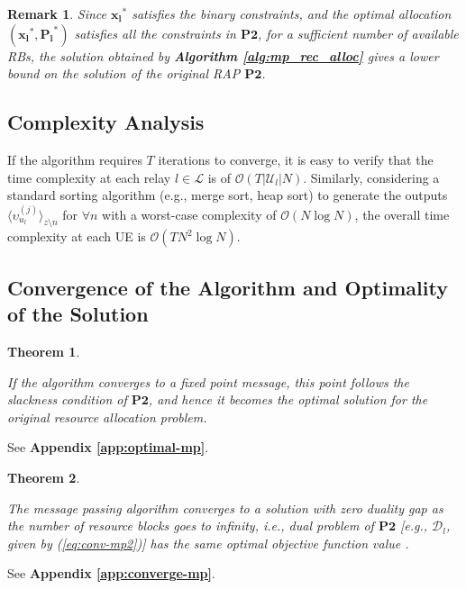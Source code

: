 \documentclass[twocolumn,10pt]{IEEEtran}
\newtheorem{theorem}{Theorem}
\newtheorem{remark}{Remark}
\begin{document}
\begin{remark}
\label{rem:algo_bound}
Since ${\mathbf{x}_{\boldsymbol l}}^*$ satisfies the binary constraints, and the optimal allocation  $\left({\mathbf{x}_{\boldsymbol l}}^*, {\mathbf{P}_{\boldsymbol l}}^*\right)$ satisfies all the constraints in $\mathbf{P2}$, for a sufficient number of available RBs, the solution obtained by {\normalfont \textbf{Algorithm \ref{alg:mp_rec_alloc}} } gives a lower bound on the solution of the original RAP $\mathbf{P2}$.
\end{remark}


\subsection{Complexity Analysis}

If the algorithm requires $T$ iterations to converge, it is easy to verify that the time complexity at each relay $l \in \mathcal{L}$ is of $\mathcal{O}(T |\mathcal{U}_l| N)$. Similarly, considering a standard sorting algorithm (e.g., merge sort, heap sort) to generate the outputs $\langle \upsilon_{u_l}^{(j)}\rangle_{z \setminus n}$ for $\forall n$ with a worst-case complexity of $\mathcal{O}(N \log N)$, the overall time complexity at each UE is $\mathcal{O}\left( T N^2 \log N \right)$. 



\subsection{Convergence of the Algorithm and Optimality of the Solution}

\begin{theorem}
\label{theorem:optimal-proof-mp}

If the algorithm converges to a fixed point message, this point follows the slackness condition of $\mathbf{P2}$, and hence it becomes the optimal solution for the original resource allocation problem.

\end{theorem}
\begin{IEEEproof}
See \textbf{Appendix \ref{app:optimal-mp}}.
\end{IEEEproof}

\begin{theorem}
\label{theorem:converge}

The message passing algorithm converges to a solution with zero duality gap as the number of resource blocks goes to infinity, i.e., dual problem of $\mathbf{P2}$ [e.g., $\mathscr{D}_l$, given by (\ref{eq:conv-mp2})] has the same optimal objective function value \cite{mp-dft}.
\end{theorem}
\begin{IEEEproof}
See \textbf{Appendix \ref{app:converge-mp}}.
\end{IEEEproof}
\end{document}
